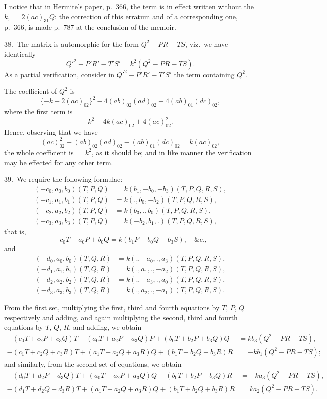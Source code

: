 \documentclass[11pt,a4paper]{book}
\begin{document}
I notice that in Hermite's paper, p.~366, the term is in effect written without the $k$, $= 2(ac)_{31}Q$: the correction of this erratum and of a corresponding one, p.~366, is made p.~787 at the conclusion of the memoir.

\medskip

38.\ The matrix is automorphic for the form $Q^2 - PR - TS$, viz.\ we have identically
\[
Q'^2 - P'R' - T'S' = k^2(Q^2 - PR - TS).
\]
As a partial verification, consider in $Q'^2 - P'R' - T'S'$ the term containing $Q^2$.

The coefficient of $Q^2$ is
\[
\{-k + 2(ac)_{02}\}^2 - 4(ab)_{02}(ad)_{02} - 4(ab)_{01}(dc)_{02},
\]
where the first term is
\[
k^2 - 4k(ac)_{02} + 4(ac)_{02}^2.
\]
Hence, observing that we have
\[
(ac)_{02}^2 - (ab)_{02}(ad)_{02} - (ab)_{01}(dc)_{02} = k(ac)_{02},
\]
the whole coefficient is $= k^2$, as it should be; and in like manner the verification may be effected for any other term.

\medskip

39.\ We require the following formulae:
\begin{align*}
(-c_0, a_0, b_0)(T, P, Q) &= k(b_1, -b_0, -b_3)(T, P, Q, R, S),\\
(-c_1, a_1, b_1)(T, P, Q) &= k(., b_0, -b_2)(T, P, Q, R, S),\\
(-c_2, a_2, b_2)(T, P, Q) &= k(b_3, ., b_0)(T, P, Q, R, S),\\
(-c_3, a_3, b_3)(T, P, Q) &= k(-b_2, b_1, .)(T, P, Q, R, S),
\end{align*}
that is,
\[
-c_0T + a_0P + b_0Q = k(b_1P - b_0Q - b_3S), \quad \text{\&c.,}
\]
and
\begin{align*}
(-d_0, a_0, b_0)(T, Q, R) &= k(., -a_0, ., a_3)(T, P, Q, R, S),\\
(-d_1, a_1, b_1)(T, Q, R) &= k(., a_1, ., -a_2)(T, P, Q, R, S),\\
(-d_2, a_2, b_2)(T, Q, R) &= k(., -a_3, ., a_0)(T, P, Q, R, S),\\
(-d_3, a_3, b_3)(T, Q, R) &= k(., a_2, ., -a_1)(T, P, Q, R, S).
\end{align*}

From the first set, multiplying the first, third and fourth equations by $T$, $P$, $Q$ respectively and adding, and again multiplying the second, third and fourth equations by $T$, $Q$, $R$, and adding, we obtain
\begin{align*}
-(c_0T + c_2P + c_3Q)T + (a_0T + a_2P + a_3Q)P + (b_0T + b_2P + b_3Q)Q &= kb_3(Q^2 - PR - TS),\\
-(c_1T + c_2Q + c_3R)T + (a_1T + a_2Q + a_3R)Q + (b_1T + b_2Q + b_3R)R &= -kb_1(Q^2 - PR - TS);
\end{align*}
and similarly, from the second set of equations, we obtain
\begin{align*}
-(d_0T + d_2P + d_3Q)T + (a_0T + a_2P + a_3Q)Q + (b_0T + b_2P + b_3Q)R &= -ka_3(Q^2 - PR - TS),\\
-(d_1T + d_2Q + d_3R)T + (a_1T + a_2Q + a_3R)Q + (b_1T + b_2Q + b_3R)R &= ka_2(Q^2 - PR - TS).
\end{align*}
\end{document}
